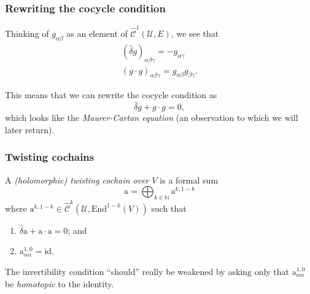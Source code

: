 \documentclass{beamer}
\begin{document}
            \begin{frame}\frametitle{Rewriting the cocycle condition}
                Thinking of $g_{\alpha\beta}$ as an element of $\hat{\mathscr{C}}^1(\mathcal{U},E)$, we see that
                \begin{gather*}
                    (\hat{\delta}g)_{\alpha\beta\gamma} = -g_{\alpha\gamma}\\
                    (g\cdot g)_{\alpha\beta\gamma} = g_{\alpha\beta}g_{\beta\gamma}.
                \end{gather*}

                \pause

                This means that we can rewrite the cocycle condition as
                \begin{equation*}
                    \hat{\delta}g + g\cdot g = 0,
                \end{equation*}
                which looks like the \emph{Maurer-Cartan equation} (an observation to which we will later return).
            \end{frame}

            \begin{frame}\frametitle{Twisting cochains}
                \begin{definition}
                    A \emph{(holomorphic) twisting cochain over $V$} is a formal sum
                    \begin{equation*}
                        \mathrm{a} = \bigoplus_{k\in\mathbb{N}} \mathrm{a}^{k,1-k}
                    \end{equation*}
                    where $\mathrm{a}^{k,1-k}\in\hat{\mathscr{C}}^k(\mathcal{U},\mathrm{End}^{1-k}(V))$ such that
                    \begin{enumerate}
                        \item $\hat{\delta}\mathrm{a} + \mathrm{a}\cdot\mathrm{a} = 0$; and
                        \item $\mathrm{a}_{\alpha\alpha}^{1,0}=\mathrm{id}$.
                    \end{enumerate}
                \end{definition}

                \pause

                The invertibility condition ``should'' really be weakened by asking only that $\mathrm{a}_{\alpha\alpha}^{1,0}$ be \emph{homotopic} to the identity.
            \end{frame}
\end{document}
